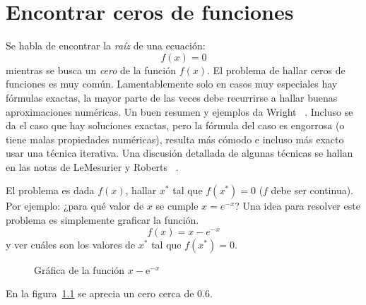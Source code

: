 

\chapter{Encontrar ceros de funciones}
\label{cha:ceros-funciones}

  Se habla de encontrar la \emph{raíz} de una ecuación:
  \begin{equation*}
    f(x)
      = 0
  \end{equation*}
  mientras se busca un \emph{cero} de la función \(f(x)\).
  El problema de hallar ceros de funciones es muy común.
  Lamentablemente solo en casos muy especiales hay fórmulas exactas,
  la mayor parte de las veces
  debe recurrirse a hallar buenas aproximaciones numéricas.
  Un buen resumen y ejemplos da Wright~%
    \cite{wright04:_nonlinear_root_finding}.
  Incluso se da el caso que hay soluciones exactas,
  pero la fórmula del caso es engorrosa
  (o tiene malas propiedades numéricas),
  resulta más cómodo
  e incluso más exacto usar una técnica iterativa.
  Una discusión detallada de algunas técnicas se hallan en las notas
  de LeMesurier y Roberts~%
    \cite{lemesurier97:_b15_numerical_analysis}.

  El problema es dada \(f(x)\),
  hallar \(x^*\) tal que \(f(x^*) = 0\)
  (\(f\) debe ser continua).
  Por ejemplo:
  ¿para qué valor de \(x\) se cumple \(x = e^{-x}\)?
  Una idea para resolver este problema es simplemente graficar la función.
  \begin{equation}
    f(x)
      = x - e^{-x}
  \end{equation}
  y ver cuáles son los valores de \(x^*\) tal que \(f(x^*) = 0\).
  \begin{figure}[ht]
    \centering
    \caption{Gráfica de la función \(x - \mathrm{e}^{-x}\)}
    \label{fig:plot-f}
  \end{figure}
  En la figura~\ref{fig:plot-f} se aprecia un cero cerca de \num{0,6}.


